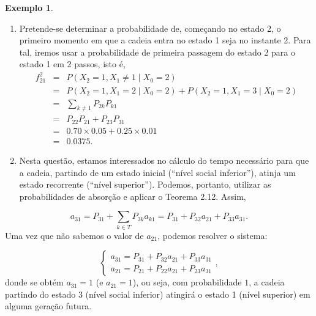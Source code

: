 \documentclass[
  11pt,
  a4paper,
]{book}
\theoremstyle{definition}
\theoremstyle{definition}
\newtheorem{example}{Exemplo}[chapter]
\theoremstyle{definition}
\theoremstyle{definition}
\theoremstyle{remark}
\begin{document}
\begin{example}
\begin{enumerate}
\def\labelenumi{\arabic{enumi}.}
\item
  Pretende-se determinar a probabilidade de, começando no estado 2, o primeiro momento em que a cadeia entra no estado 1 seja no instante 2. Para tal, iremos usar a probabilidade de primeira passagem do estado 2 para o estado 1 em 2 passos, isto é,
  \begin{eqnarray*}
  f_{21}^2 &=& P(X_2=1, X_1 \neq 1 \mid X_0=2) \\
        &=& P(X_2=1, X_1 = 2 \mid X_0=2)+P(X_2=1, X_1 = 3 \mid X_0=2)\\
        &=& \sum\limits_{k \neq 1} P_{2k}P_{k1}\\
        &=& P_{22}P_{21}+P_{23}P_{31}\\
        &=& 0.70 \times 0.05 + 0.25 \times 0.01\\
        &=& 0.0375.
  \end{eqnarray*}
\item
  Nesta questão, estamos interessados no cálculo do tempo necessário para que a cadeia, partindo de um estado inicial (``nível social inferior''), atinja um estado recorrente (``nível superior''). Podemos, portanto, utilizar as probabilidades de absorção e aplicar o Teorema 2.12. Assim,
\end{enumerate}

\[a_{31}=P_{31}+\sum\limits_{k \in T} P_{3k}a_{k1}=P_{31}+P_{32}a_{21}+P_{33}a_{31}.\]
Uma vez que não sabemos o valor de \(a_{21}\), podemos resolver o sistema:

\[
\begin{cases}
a_{31} = P_{31} + P_{32} a_{21} + P_{33} a_{31} \\
a_{21} = P_{21} + P_{22} a_{21} + P_{23} a_{31}
\end{cases}, 
\]
donde se obtém \(a_{31}=1\) (e \(a_{21}=1\)), ou seja, com probabilidade \(1\), a cadeia partindo do estado 3 (nível social inferior) atingirá o estado 1 (nível superior) em alguma geração futura.
\end{example}

\(\,\)
\end{document}
